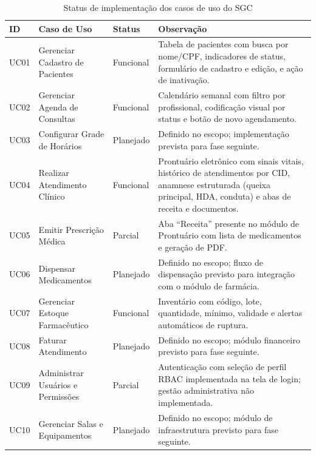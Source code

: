 \renewcommand{\arraystretch}{1.3}
\begin{table}[H]
\centering
\small
\begin{tabularx}{\textwidth}{|p{1.2cm}|p{5.2cm}|p{2.8cm}|X|}
\hline
\textbf{ID} & \textbf{Caso de Uso} & \textbf{Status} & \textbf{Observação} \\ \hline
UC01 & Gerenciar Cadastro de Pacientes   & Funcional & Tabela de pacientes com busca por nome/CPF, indicadores de status, formulário de cadastro e edição, e ação de inativação. \\ \hline
UC02 & Gerenciar Agenda de Consultas     & Funcional & Calendário semanal com filtro por profissional, codificação visual por status e botão de novo agendamento. \\ \hline
UC03 & Configurar Grade de Horários      & Planejado           & Definido no escopo; implementação prevista para fase seguinte. \\ \hline
UC04 & Realizar Atendimento Clínico      & Funcional & Prontuário eletrônico com sinais vitais, histórico de atendimentos por CID, anamnese estruturada (queixa principal, HDA, conduta) e abas de receita e documentos. \\ \hline
UC05 & Emitir Prescrição Médica          & Parcial             & Aba ``Receita'' presente no módulo de Prontuário com lista de medicamentos e geração de PDF. \\ \hline
UC06 & Dispensar Medicamentos            & Planejado           & Definido no escopo; fluxo de dispensação previsto para integração com o módulo de farmácia. \\ \hline
UC07 & Gerenciar Estoque Farmacêutico    & Funcional & Inventário com código, lote, quantidade, mínimo, validade e alertas automáticos de ruptura. \\ \hline
UC08 & Faturar Atendimento               & Planejado           & Definido no escopo; módulo financeiro previsto para fase seguinte. \\ \hline
UC09 & Administrar Usuários e Permissões & Parcial             & Autenticação com seleção de perfil RBAC implementada na tela de login; gestão administrativa não implementada. \\ \hline
UC10 & Gerenciar Salas e Equipamentos    & Planejado           & Definido no escopo; módulo de infraestrutura previsto para fase seguinte. \\ \hline
\end{tabularx}
\caption{Status de implementação dos casos de uso do SGC}
\label{tab:status-ucs}
\end{table}


